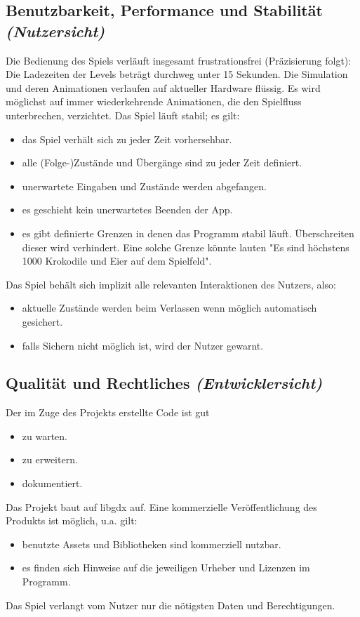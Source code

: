 \subsection{Benutzbarkeit, Performance und Stabilität \textit{(Nutzersicht)}}
\begin{requirements}
	 Die Bedienung des Spiels verläuft insgesamt frustrationsfrei (Präzisierung folgt):
	 Die Ladezeiten der Levels beträgt durchweg unter 15 Sekunden.
	 Die Simulation und deren Animationen verlaufen auf aktueller Hardware flüssig.
	 Es wird möglichst auf immer wiederkehrende Animationen, die den Spielfluss unterbrechen, verzichtet.
	 Das Spiel läuft stabil; es gilt:
		\begin{itemize}
			\item das Spiel verhält sich zu jeder Zeit vorhersehbar.
			\item alle (Folge-)Zustände und Übergänge sind zu jeder Zeit definiert.
			\item unerwartete Eingaben und Zustände werden abgefangen.
			\item es geschieht kein unerwartetes Beenden der App.
			\item es gibt definierte Grenzen in denen das Programm stabil läuft. Überschreiten dieser wird verhindert. Eine solche Grenze könnte lauten "Es sind höchstens 1000 Krokodile und Eier auf dem Spielfeld".
		\end{itemize}
	 Das Spiel behält sich implizit alle relevanten Interaktionen des Nutzers, also:
		\begin{itemize}
			\item aktuelle Zustände werden beim Verlassen wenn möglich automatisch gesichert.
			\item falls Sichern nicht möglich ist, wird der Nutzer gewarnt.
		\end{itemize}
\end{requirements}

\subsection{Qualität und Rechtliches \textit{(Entwicklersicht)}}
\begin{requirements}
	 Der im Zuge des Projekts erstellte Code ist gut
		\begin{itemize}
			\item zu warten.
			\item zu erweitern.
			\item dokumentiert.
		\end{itemize}
	 Das Projekt baut auf libgdx auf.
	 Eine kommerzielle Veröffentlichung des Produkts ist möglich, u.a. gilt:
		\begin{itemize}
			\item benutzte Assets und Bibliotheken sind kommerziell nutzbar.
			\item es finden sich Hinweise auf die jeweiligen Urheber und Lizenzen im Programm.
		\end{itemize}
	 Das Spiel verlangt vom Nutzer nur die nötigsten Daten und Berechtigungen.
\end{requirements}
